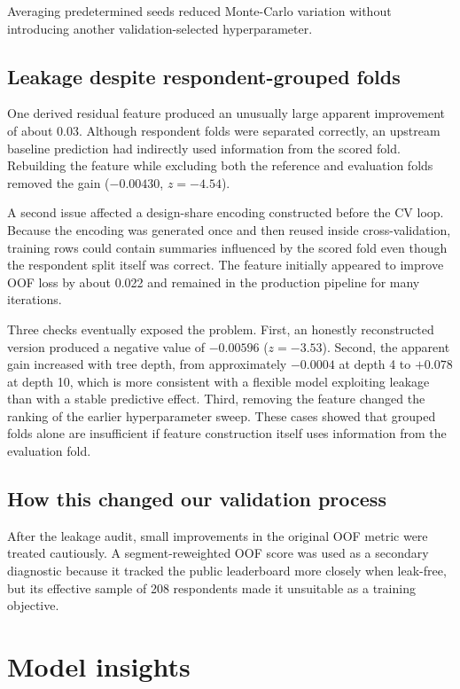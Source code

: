 \documentclass[11pt]{article}
\begin{document}
Averaging predetermined seeds reduced Monte-Carlo variation without introducing another
validation-selected hyperparameter.

\subsection{Leakage despite respondent-grouped folds}

One derived residual feature produced an unusually large apparent improvement of about
0.03. Although respondent folds were separated correctly, an upstream baseline prediction
had indirectly used information from the scored fold. Rebuilding the feature while
excluding both the reference and evaluation folds removed the gain
($-0.00430$, $z=-4.54$).

A second issue affected a design-share encoding constructed before the CV loop. Because
the encoding was generated once and then reused inside cross-validation, training rows
could contain summaries influenced by the scored fold even though the respondent split
itself was correct. The feature initially appeared to improve OOF loss by about 0.022 and
remained in the production pipeline for many iterations.

Three checks eventually exposed the problem. First, an honestly reconstructed version
produced a negative value of $-0.00596$ ($z=-3.53$). Second, the apparent gain increased
with tree depth, from approximately $-0.0004$ at depth 4 to $+0.078$ at depth 10, which is
more consistent with a flexible model exploiting leakage than with a stable predictive
effect. Third, removing the feature changed the ranking of the earlier hyperparameter
sweep. These cases showed that grouped folds alone are insufficient if feature
construction itself uses information from the evaluation fold.

\subsection{How this changed our validation process}

After the leakage audit, small improvements in the original OOF metric were treated
cautiously. A segment-reweighted OOF score was used as a secondary diagnostic because it
tracked the public leaderboard more closely when leak-free, but its effective sample of
208 respondents made it unsuitable as a training objective.

\section{Model insights}\label{sec:insight}
\end{document}
